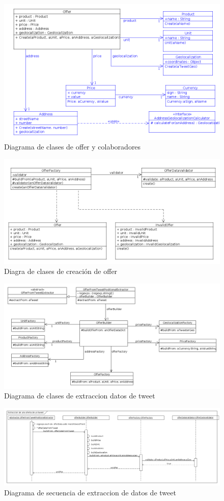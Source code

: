 \begin{figure}[ht]
\includegraphics[width=\textwidth]{./imgs/class_diagram_offer.png}
\caption{Diagrama de clases de offer y colaboradores}
\end{figure}

\begin{figure}[ht]
\includegraphics[width=\textwidth]{./imgs/class_diagram_Offer_Factory.png}
\caption{Diagra de clases de creación de offer}
\end{figure}

\begin{figure}[ht]
\includegraphics[width=\textwidth]{./imgs/class_diagram_parsing.png}
\caption{Diagrama de clases de extraccion datos de tweet}
\end{figure}

\begin{figure}[ht]
\includegraphics[width=\textwidth]{./imgs/sequence_diagram_parsing.png}
\caption{Diagrama de secuencia de extraccion de datos de tweet}
\end{figure}

